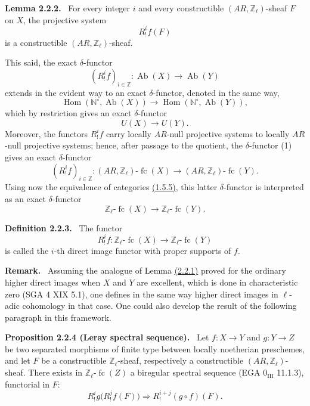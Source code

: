\documentclass[11pt]{article}
\newenvironment{statement}[1]{\par\medskip\noindent\textbf{#1.}\ }{\par\medskip}
\DeclareMathOperator{\Hom}{Hom}
\providecommand{\Hom}{\operatorname{Hom}}
\providecommand{\Ab}{\operatorname{Ab}}
\providecommand{\fc}{\operatorname{fc}}
\providecommand{\Ab}{\operatorname{Ab}}
\providecommand{\Hom}{\operatorname{Hom}}
\begin{document}
\label{sga5:VI:lemma:2.2.2}\begin{statement}{Lemma 2.2.2}
For every integer \(i\) and every constructible \((AR,\mathbb Z_\ell)\)-sheaf \(F\) on \(X\), the projective system
\[
R^i_!f(F)
\]
is a constructible \((AR,\mathbb Z_\ell)\)-sheaf.
\end{statement}

This said, the exact \(\delta\)-functor
\[
(R^i_!f)_{i\in\mathbb Z}:\Ab(X)\longrightarrow \Ab(Y)
\]
extends in the evident way to an exact \(\delta\)-functor, denoted in the same way,
\[
\Hom(\mathbb N^\circ,\Ab(X))\longrightarrow \Hom(\mathbb N^\circ,\Ab(Y)),
\]
which by restriction gives an exact \(\delta\)-functor
\[
U(X)\longrightarrow U(Y).
\tag{1}\label{sga5:VI:equation:1:2}
\]
Moreover, the functors \(R^i_!f\) carry locally \(AR\)-null projective systems to locally \(AR\)-null projective systems; hence, after passage to the quotient, the \(\delta\)-functor (1) gives an exact \(\delta\)-functor
\[
(R^i_!f)_{i\in\mathbb Z}:(AR,\mathbb Z_\ell)\text{-}\fc(X)
\longrightarrow (AR,\mathbb Z_\ell)\text{-}\fc(Y).
\]
Using now the equivalence of categories \hyperref[sga5:VI:proposition:1.5.5]{(1.5.5)}, this latter \(\delta\)-functor is interpreted as an exact \(\delta\)-functor
\[
\mathbb Z_\ell\text{-}\fc(X)\longrightarrow \mathbb Z_\ell\text{-}\fc(Y).
\]

\label{sga5:VI:definition:2.2.3}\begin{statement}{Definition 2.2.3}
The functor
\[
R^i_!f:\mathbb Z_\ell\text{-}\fc(X)\longrightarrow \mathbb Z_\ell\text{-}\fc(Y)
\]
is called the \(i\)-th direct image functor with proper supports of \(f\).
\end{statement}

\begin{statement}{Remark}
Assuming the analogue of Lemma \hyperref[sga5:VI:lemma:2.2.1]{(2.2.1)} proved for the ordinary higher direct images when \(X\) and \(Y\) are excellent, which is done in characteristic zero (SGA 4 XIX 5.1), one defines in the same way higher direct images in \(\ell\)-adic cohomology in that case. One could also develop the result of the following paragraph in this framework.
\end{statement}

\label{sga5:VI:proposition:2.2.4}\begin{statement}{Proposition 2.2.4 (Leray spectral sequence)}
Let \(f:X\to Y\) and \(g:Y\to Z\) be two separated morphisms of finite type between locally noetherian preschemes, and let \(F\) be a constructible \(\mathbb Z_\ell\)-sheaf, respectively a constructible \((AR,\mathbb Z_\ell)\)-sheaf. There exists in \(\mathbb Z_\ell\text{-}\fc(Z)\) a biregular spectral sequence (EGA \(0_{\mathrm{III}}\) 11.1.3), functorial in \(F\):
\[
R^i_!g\bigl(R^j_!f(F)\bigr)\Longrightarrow R^{i+j}_!(g\circ f)(F).
\]
\end{statement}
\end{document}
